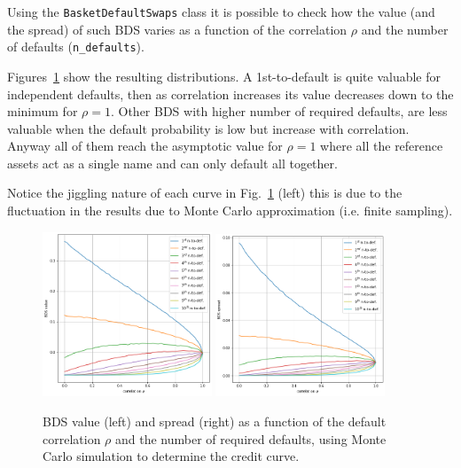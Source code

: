 Using the \texttt{BasketDefaultSwaps} class it is possible to check how the value (and the spread) of such BDS varies as a function of the correlation $\rho$ and the number of defaults (\texttt{n\_defaults}).

Figures~\ref{fig:bds_value_mc} show the resulting distributions. A 1st-to-default is quite valuable for independent defaults, then as correlation increases its value decreases down to the minimum for $\rho=1$.
Other BDS with higher number of required defaults, are less valuable when the default probability is low but increase with correlation. Anyway all of them reach the asymptotic value for $\rho=1$ where all the reference assets act as a single name and can only default all together.

Notice the jiggling nature of each curve in Fig.~\ref{fig:bds_value_mc} (left) this is due to the fluctuation in the results due to Monte Carlo approximation (i.e. finite sampling).

\begin{figure}[htb]
\centering
\includegraphics[width=0.45\textwidth]{figures/bds_value_mc}
\quad
\includegraphics[width=0.45\textwidth]{figures/bds_spread_mc}
\caption{BDS value (left) and spread (right) as a function of the default correlation $\rho$ and the number of required defaults, using Monte Carlo simulation to determine the credit curve.}
\label{fig:bds_value_mc}
\end{figure}

